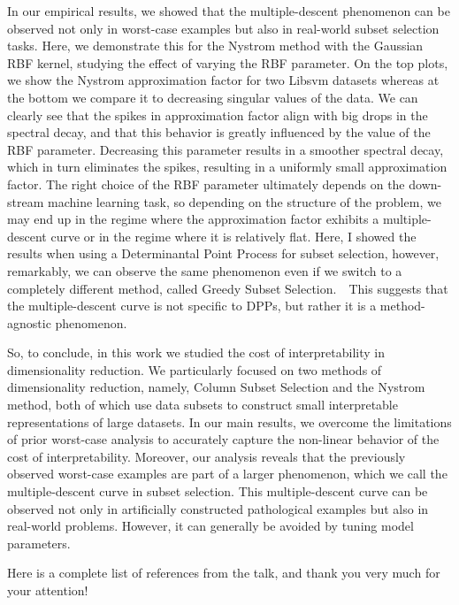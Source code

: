 \documentclass[11pt]{article}
\def\b{{~\textbullet~}}
\begin{document}
In our empirical results, we showed that the multiple-descent
phenomenon can be observed not only in worst-case 
examples but also in real-world subset selection tasks. Here, we
demonstrate this for the Nystrom method with the Gaussian RBF kernel,
studying the effect of varying the RBF parameter. On the top plots, we
show the Nystrom approximation factor for two Libsvm datasets whereas
at the bottom we compare it to decreasing singular values of the
data. We can clearly see that the spikes in approximation factor align
with big drops in the spectral decay, and that this behavior is
greatly influenced by the value of the RBF parameter. Decreasing this
parameter results in a smoother spectral decay, which in turn
eliminates the spikes, resulting in a uniformly small approximation
factor. The right choice of the RBF parameter ultimately depends on
the down-stream machine learning task, so depending on the structure
of the problem, we may end up in the regime where the
approximation factor exhibits a multiple-descent curve or in the
regime where it is relatively flat. Here, I showed the results when using a
Determinantal Point Process for subset selection, however, remarkably,
we can observe the same phenomenon even if we switch to a completely
different method, called Greedy Subset Selection.\b This suggests that
the multiple-descent curve is not specific to DPPs, but rather
it is a method-agnostic phenomenon.

So, to conclude, in this work we studied the cost of interpretability
in dimensionality reduction. We particularly focused on two methods of
dimensionality reduction, namely, Column Subset Selection and the
Nystrom method, both of which use data subsets to construct small
interpretable representations of large datasets. In our main results,
we overcome the limitations of prior worst-case analysis to accurately
capture the non-linear behavior of the cost of interpretability. Moreover, our
analysis reveals that the previously observed worst-case examples are
part of a larger phenomenon, which we call the multiple-descent curve
in subset selection. This multiple-descent curve can be observed not
only in artificially constructed pathological examples but also in
real-world problems. However, it can generally be avoided by tuning
model parameters. 

Here is a complete list of references from the talk, and thank you
very much for your attention!

\newpage
      
      
\end{document}
